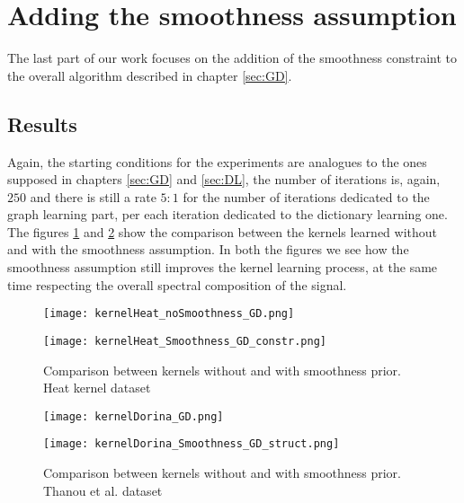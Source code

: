 \section{Adding the smoothness assumption}
The last part of our work focuses on the addition of the smoothness constraint to the overall algorithm described in chapter \ref{sec:GD}.
\subsection{Results}
Again, the starting conditions for the experiments are analogues to the ones supposed in chapters \ref{sec:GD} and \ref{sec:DL}, the number of iterations is, again, $250$ and there is still a rate $5:1$ for the number of iterations dedicated to the graph learning part, per each iteration dedicated to the dictionary learning one.
\\

The figures \ref{fig:alphaHeatGD_smth} and \ref{fig:alphaDorinaGD_smth} show the comparison between the kernels learned without and with the smoothness assumption. In both the figures we see how the smoothness assumption still improves the kernel learning process, at the same time respecting the overall spectral composition of the signal.

\begin{figure}
  \centering
  \begin{minipage}[c]{.8\textwidth}
    \centering
    \texttt{[image: kernelHeat\_noSmoothness\_GD.png]}
  \end{minipage}
  \begin{minipage}[c]{.8\textwidth}
    \centering
    \texttt{[image: kernelHeat\_Smoothness\_GD\_constr.png]}
  \end{minipage}
  \caption{Comparison between kernels without and with smoothness prior. Heat kernel dataset}
  \label{fig:alphaHeatGD_smth}
\end{figure}

\begin{figure}
  \centering
  \begin{minipage}[c]{.8\textwidth}
    \centering
    \texttt{[image: kernelDorina\_GD.png]}
  \end{minipage}
  \begin{minipage}[c]{.8\textwidth}
    \centering
    \texttt{[image: kernelDorina\_Smoothness\_GD\_struct.png]}
  \end{minipage}
  \caption{Comparison between kernels without and with smoothness prior. Thanou et al. dataset}
  \label{fig:alphaDorinaGD_smth}
\end{figure}

